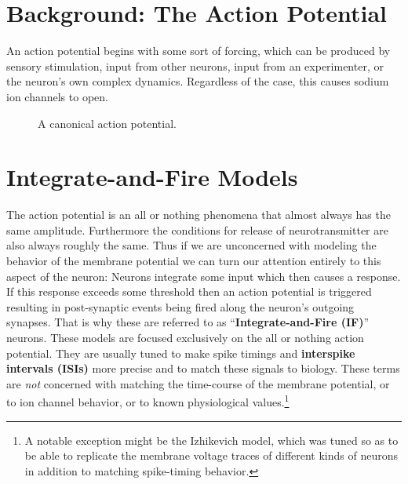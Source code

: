\section{Background: The Action Potential}

An action potential begins with some sort of forcing, which can be produced by sensory stimulation, input from other neurons, input from an experimenter, or the neuron's own complex dynamics. Regardless of the case, this causes sodium ion channels to open.

\begin{figure}[h]
	\centering
{}
	\caption[Simbrain screenshot]{A canonical action potential.}
	\label{ActPot}
\end{figure}


\section{Integrate-and-Fire Models}

The action potential is an all or nothing phenomena that almost always has the same amplitude. Furthermore the conditions for release of neurotransmitter are also always roughly the same. Thus if we are unconcerned with modeling the behavior of the membrane potential we can turn our attention entirely to this aspect of the neuron: Neurons integrate some input which then causes a response. If this response exceeds some threshold then an action potential is triggered resulting in post-synaptic events being fired along the neuron's outgoing synapses. That is why these are referred to as ``\textbf{Integrate-and-Fire (IF)}'' neurons. These models are focused exclusively on the all or nothing action potential. They are usually tuned to make spike timings and \textbf{interspike intervals (ISIs)} more precise and to match these signals to biology. These terms are \emph{not} concerned with matching the time-course of the membrane potential, or to ion channel behavior, or to known physiological values.\footnote{A notable exception might be the Izhikevich model, which was tuned so as to be able to replicate the membrane voltage traces of different kinds of neurons in addition to matching spike-timing behavior.}

